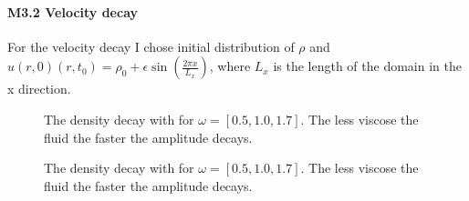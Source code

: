 \documentclass[a4paper,11pt]{article}
\begin{document}
\paragraph{M3.2 Velocity decay}
For the velocity decay I chose initial distribution of $\rho $ and $u(r,0) (r,t_{0})=\rho_{0}+\epsilon \sin \left( \frac{2\pi x}{L_{x}} \right)$, where $L_{x}$ is the length of the domain in the x direction.
\begin{figure}[ht]
\centering
\resizebox{\columnwidth}{!}{\large}
\vspace*{-10mm}
\caption[Density decay]{The density decay with for $\omega=[0.5,1.0,1.7]$. The less viscose the fluid the faster the amplitude decays.}
\label{fig:m3-1}
\end{figure}

\begin{figure}[ht]
\centering
\resizebox{\columnwidth}{!}{\large}
\vspace*{-10mm}
\caption[Density decay]{The density decay with for $\omega=[0.5,1.0,1.7]$. The less viscose the fluid the faster the amplitude decays.}
\label{fig:m3-1}
\end{figure}










% 
\end{document}
